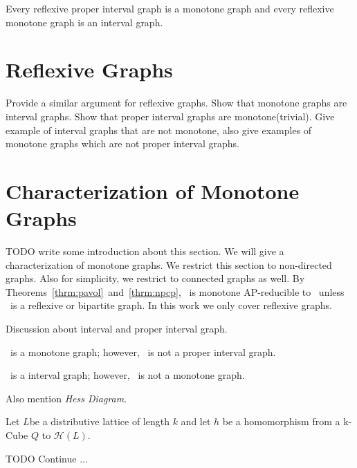 \begin{cor}
Every reflexive proper interval graph is a monotone graph and
every reflexive monotone graph is an interval graph.
\end{cor}

\section{Reflexive Graphs}
Provide a similar argument for reflexive graphs. Show that monotone graphs are interval graphs.
Show that proper interval graphs are monotone(trivial). Give example of interval graphs that
are not monotone, also give examples of monotone graphs which are not proper interval graphs.


\section{Characterization of Monotone Graphs}
TODO write some introduction about this section. We will give a characterization of
monotone graphs. We restrict this section to non-directed graphs. Also for simplicity,
we restrict to connected graphs as well. By Theorems~\ref{thrm:pavol}~and~\ref{thrm:npcp},
\mH\ is monotone AP-reducible to \csat\ unless \mH\ is a reflexive or bipartite graph.	
In this work we only cover reflexive graphs.

Discussion about interval and proper interval graph.

\begin{example}
\mH\ is a monotone graph; however, \mH\ is not a proper interval graph.
\end{example}

\begin{example}
\mH\ is a interval graph; however, \mH\ is not a monotone graph.
\end{example}

\begin{defi} 
Also mention \emph{Hess Diagram}.
\end{defi}

\begin{defi} 
\end{defi}


Let \(L\)be a distributive lattice of length \(k\) and let \(h\) be  a homomorphism from a 
k-Cube \(Q\) to \(\mathcal{H}(L)\)\@.

TODO Continue ...
